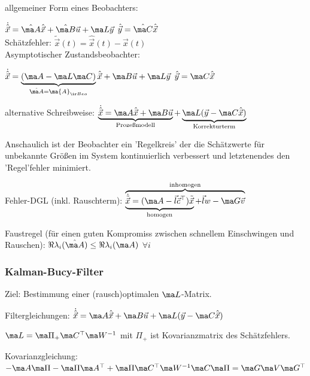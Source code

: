 \documentclass[german]{latex4ei/latex4ei_sheet}
\begin{document}
\begin{sectionbox}
		allgemeiner Form eines Beobachters:

		$\dot{\hat{\vec x}} = \hat{\ma A} \hat{\vec x} + \hat{\ma B} \vec u + \ma L \vec y$
		\quad \quad
		$\hat{\vec y} = \hat{\ma C} \hat{\vec x}$ \\


		Schätzfehler:
		$\tilde{\vec x} (t) = \hat{\vec x} (t)- \vec x(t)$ \\



		Asymptotischer Zustandsbeobachter:

		\begin{emphbox}$\dot{\hat{\vec x}} = \underbrace{(\ma A - \ma L \ma C)}_{\hat{\ma A}  = \ma{A}_{\ir Beo}} \hat{\vec x}  + \ma B \vec u + \ma L \vec y$ \quad \quad
		$\hat{\vec y} = \ma C \hat{\vec x}$\end{emphbox}

		alternative Schreibweise:
		$\underbrace{\dot{\hat{\vec x}} = \ma A \hat{\vec x} + \ma B \vec u}_{\text{Prozeßmodell}} + \underbrace{\ma L ( \vec y - \ma C \hat{\vec x})}_{\text{Korrekturterm}}$

		Anschaulich ist der Beobachter ein 'Regelkreis' der die Schätzwerte für unbekannte Größen im System kontinuierlich verbessert und letztenendes den 'Regel'fehler minimiert.

		Fehler-DGL (inkl. Rauschterm):
		$\overbrace{\underbrace{\dot{\tilde{\vec x}} = ( \ma A - \vec l \vec c^\top ) \tilde{\vec x}}_{\text{homogen}} + \vec l w - \ma G \vec v}^{\text{inhomogen}}$

		Faustregel (für einen guten Kompromiss zwischen schnellem Einschwingen und Rauschen):
		$\Re{\lambda_i (\hat{\ma A})} \le \Re{\lambda_i (\ma A)}$ \quad $\forall i$

		\subsubsection{Kalman-Bucy-Filter}
		Ziel: Bestimmung einer (rausch)optimalen $\ma L$-Matrix.

		Filtergleichungen:
		$\dot{\hat{\vec x}} = \ma A \hat{\vec x} + \ma B \vec u + \ma L (\vec y - \ma C \hat{ \vec x})$

		$\ma L = \ma \Pi_{+} \ma C^\top \ma W^{-1}$ mit $\Pi_{+}$ ist Kovarianzmatrix des Schätzfehlers.

		Kovarianzgleichung:
		$- \ma A \ma \Pi - \ma \Pi \ma A^\top + \ma \Pi \ma C^\top \ma W^{-1} \ma C \ma \Pi = \ma G \ma V \ma G^\top$
\end{sectionbox}
\end{document}
